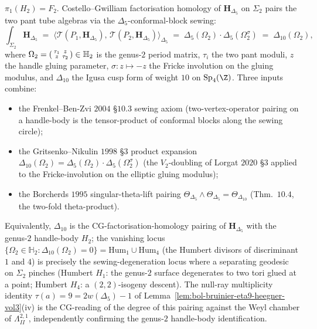 \begin{proposition}
\begin{enumerate}[label=(\alph*),leftmargin=1.5em]
 $\pi_1(H_2)=F_2$. Costello--Gwilliam factorisation homology of
 $\mathbf H_{\Delta_5}$ on $\Sigma_2$ pairs the two pant tube
 algebras via the $\Delta_5$-conformal-block sewing:
 \[
 \int_{\Sigma_2}\mathbf H_{\Delta_5}
 \;=\;
 \bigl\langle
 \mathcal T(P_1,\mathbf H_{\Delta_5}),\,
 \mathcal T(P_2,\mathbf H_{\Delta_5})
 \bigr\rangle_{\Delta_5}
 \;=\;
 \Delta_5(\Omega_2)\cdot\Delta_5(\Omega_2^\sigma)
 \;=\;
 \Delta_{10}(\Omega_2),
 \]
 where
 $\Omega_2=\begin{psmallmatrix}\tau_1&z\\z&\tau_2\end{psmallmatrix}
 \in\mathbb H_2$ is the genus-$2$ period matrix, $\tau_i$ the
 two pant moduli, $z$ the handle gluing parameter,
 $\sigma:z\mapsto -z$ the Fricke involution on the gluing modulus,
 and $\Delta_{10}$ the Igusa cusp form of weight $10$ on
 $\mathrm{Sp}_4(\Z)$. Three inputs combine:
 \begin{itemize}[leftmargin=1.2em,itemsep=0.2em]
 \item the Frenkel--Ben-Zvi $2004$ \S$10.3$ sewing axiom
 (two-vertex-operator pairing on a handle-body is the
 tensor-product of conformal blocks along the sewing
 circle);
 \item the Gritsenko--Nikulin $1998$ \S$3$ product expansion
 $\Delta_{10}(\Omega_2)=\Delta_5(\Omega_2)\cdot
 \Delta_5(\Omega_2^\sigma)$ (the $V_2$-doubling of Lorgat
 $2020$ \S$3$ applied to the Fricke-involution on the
 elliptic gluing modulus);
 \item the Borcherds $1995$ singular-theta-lift pairing
 $\Theta_{\Delta_5}\wedge\Theta_{\Delta_5}=\Theta_{\Delta_{10}}$
 (Thm.\ $10.4$, the two-fold theta-product).
 \end{itemize}
 Equivalently, $\Delta_{10}$ is the CG-factorisation-homology
 pairing of $\mathbf H_{\Delta_5}$ with the genus-$2$ handle-body
 $H_2$; the vanishing locus
 $\{\Omega_2\in\mathbb H_2:\Delta_{10}(\Omega_2)=0\}
 =\mathrm{Hum}_1\cup\mathrm{Hum}_4$ (the Humbert divisors of
 discriminant $1$ and $4$) is precisely the
 sewing-degeneration locus where a separating geodesic on
 $\Sigma_2$ pinches (Humbert $H_1$: the genus-$2$ surface
 degenerates to two tori glued at a point; Humbert $H_4$: a
 $(2,2)$-isogeny descent). The null-ray multiplicity identity
 $\tau(a)=9=2w(\Delta_5)-1$ of
 Lemma~\ref{lem:bol-bruinier-eta9-heegner-vol3}(iv) is the
 CG-reading of the degree of this pairing against the Weyl chamber
 of $\Lambda^{2,1}_{II}$, independently confirming the
 genus-$2$ handle-body identification.
\end{enumerate}

\end{proposition}
